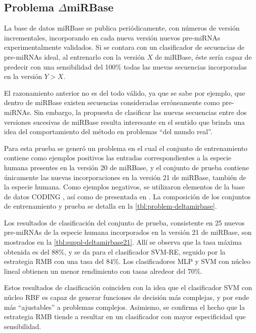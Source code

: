 
\subsection{Problema $\mathbf{\mathsf{\Delta}}$miRBase}
La base de datos miRBase se publica periódicamente, con números de
versión incrementales, incorporando en cada nueva versión nuevos
pre-miRNAs experimentalmente validados.  Si se contara con un
clasificador de secuencias de pre-miRNAs ideal, al entrenarlo con la
versión $X$ de miRBase, éste sería capaz de predecir con una
sensibilidad del 100\% todas las nuevas secuencias incorporadas en la
versión $Y>X$.

El razonamiento anterior no es del todo válido, ya que se sabe por
ejemplo, que dentro de miRBase existen secuencias consideradas
erróneamente como pre-miRNAs.  Sin embargo, la propuesta de clasificar
las nuevas secuencias entre dos versiones sucesivas de miRBase resulta
interesante en el sentido que brinda una idea del comportamiento del
método en problemas ``del mundo real''.

Para esta prueba se generó un problema \deltamirbase{} en el cual el conjunto de entrenamiento
contiene como ejemplos positivos  las entradas correspondientes
a la especie humana presentes en la versión 20 de miRBase,
y el conjunto de prueba contiene únicamente las nuevas incorporaciones
en la versión 21 de miRBase, también de la especie humana.
Como ejemplos negativos, se utilizaron elementos de la base de datos CODING \cite{xue},
así como de  presentada en \cite{batuwita}.
La composición de los conjuntos de entrenamiento y prueba se detalla en
la \autoref{tbl:problem-deltamirbase}.

Los resultados de clasificación del conjunto de prueba, consistente en
25 nuevos pre-miRNAs de la especie humana incorporados en la versión
21 de miRBase, son mostrados en la \autoref{tbl:suppl-deltamirbase21}.
Allí se observa que la tasa máxima obtenida es del 88\%, y se da para
el clasificador SVM-RE, seguido por la estrategia RMB con una tasa del
84\%. Los clasificadores MLP y SVM con núcleo lineal obtienen un menor
rendimiento con tasas alredeor del 70\%.

Estos resultados de clasificación coinciden con la idea que el
clasificador SVM con núcleo RBF es capaz de generar funciones de
decisión más complejas, y por ende más ``ajustables'' a problemas
complejos. Asimismo, se confirma el hecho que la estrategia RMB tiende
a resultar en un clasificador con mayor especificidad que
sensibilidad.
